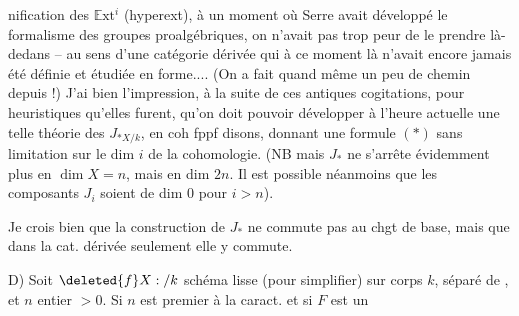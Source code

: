 %
nification des $\mathbb{E}\mathrm{xt}^{i}$ (hyperext), à un moment où Serre avait développé le formalisme des groupes proalgébriques, on n'avait pas trop peur de le prendre là-dedans -- au sens d'une catégorie dérivée qui à ce moment là n'avait encore jamais été définie et étudiée en forme.... (On a fait quand même un peu de chemin depuis !) J'ai bien l'impression, à la suite de ces antiques cogitations, pour heuristiques qu'elles furent, qu'on doit pouvoir développer à l'heure actuelle une telle théorie des $J_{*X/k}$, en coh fppf disons, donnant une formule $(*)$ sans limitation sur le dim $i$ de la cohomologie. (NB mais $J_*$ ne s'arrête évidemment plus en $\dim X=n$, mais en dim $2n$. Il est possible néanmoins que les composants $J_i$ soient de dim $0$ pour $i>n$).

Je crois bien que la construction de $J_*$ ne commute pas au chgt de base, mais que dans la cat. dérivée seulement elle y commute.

D) Soit $\deleted{f}X:/k$ schéma lisse  (pour simplifier) sur corps $k$, séparé de ,  et $n$ entier $>0$. Si $n$ est premier à la caract. et si $F$ est un

